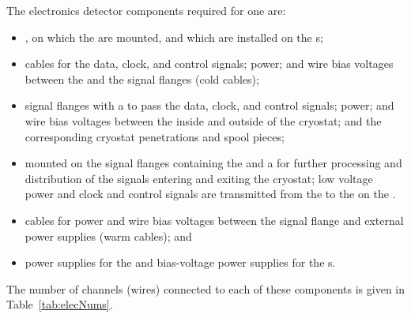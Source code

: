 The  electronics detector components required for one  are: 
\begin{itemize}
\item{, on which the  are mounted, and 
which are installed on the s;}
\item{cables for the data, clock, and control signals;  
power; and wire bias voltages between the  and the 
signal flanges (cold cables);}
\item{signal flanges with a  \fdth to pass the data, clock, 
and control signals;  power; and  wire bias 
voltages between the inside and outside of the cryostat; and 
the corresponding cryostat penetrations and spool pieces;}
\item{ mounted on the signal flanges 
containing the  and a  for further processing
and distribution of the signals entering and exiting the cryostat;
low voltage power and clock and control signals are transmitted
from the  to the  on 
the .}
\item{cables for  power and wire bias voltages between 
the signal flange and external power supplies (warm cables); and}
\item{ power supplies for the  and bias-voltage 
power supplies for the s.}
\end{itemize}

The number of channels (wires) connected to each of these
components is given in Table~\ref{tab:elecNums}.

